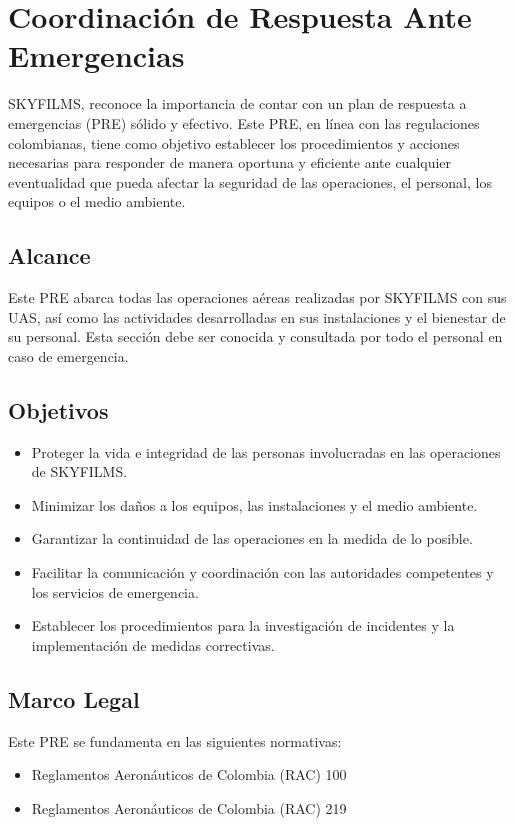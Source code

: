 \section{Coordinación de Respuesta Ante Emergencias}
SKYFILMS, reconoce la importancia de contar con un plan de respuesta a emergencias (PRE) sólido y efectivo. Este PRE, en línea con las regulaciones colombianas, tiene como objetivo establecer los procedimientos y acciones necesarias para responder de manera oportuna y eficiente ante cualquier eventualidad que pueda afectar la seguridad de las operaciones, el personal, los equipos o el medio ambiente.

\subsection{Alcance}
Este PRE abarca todas las operaciones aéreas realizadas por SKYFILMS con sus UAS, así como las actividades desarrolladas en sus instalaciones y el bienestar de su personal. Esta sección debe ser conocida y consultada por todo el personal en caso de emergencia.

\subsection{Objetivos}

\begin{itemize}
    \item Proteger la vida e integridad de las personas involucradas en las operaciones de SKYFILMS.
    \item Minimizar los daños a los equipos, las instalaciones y el medio ambiente.
    \item Garantizar la continuidad de las operaciones en la medida de lo posible.
    \item Facilitar la comunicación y coordinación con las autoridades competentes y los servicios de emergencia.
    \item Establecer los procedimientos para la investigación de incidentes y la implementación de medidas correctivas.
\end{itemize}

\subsection{Marco Legal}
Este PRE se fundamenta en las siguientes normativas:

\begin{itemize}
    \item Reglamentos Aeronáuticos de Colombia (RAC) 100
    \item Reglamentos Aeronáuticos de Colombia (RAC) 219
\end{itemize}

